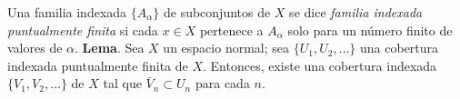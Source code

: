 
\item Una familia indexada \( \{ A_{\alpha} \} \) de subconjuntos de \( X \) se dice \textit{familia indexada puntualmente finita} si cada \( x \in X \) pertenece a \( A_{\alpha} \) solo para un número finito de valores de \( \alpha \).  
    \textbf{Lema}. Sea \( X \) un espacio normal; sea \( \{ U_1, U_2, \dots \} \) una cobertura indexada puntualmente finita de \( X \). Entonces, existe una cobertura indexada \( \{ V_1, V_2, \dots \} \) de \( X \) tal que \( \bar{V}_n \subset U_n \) para cada \( n \).